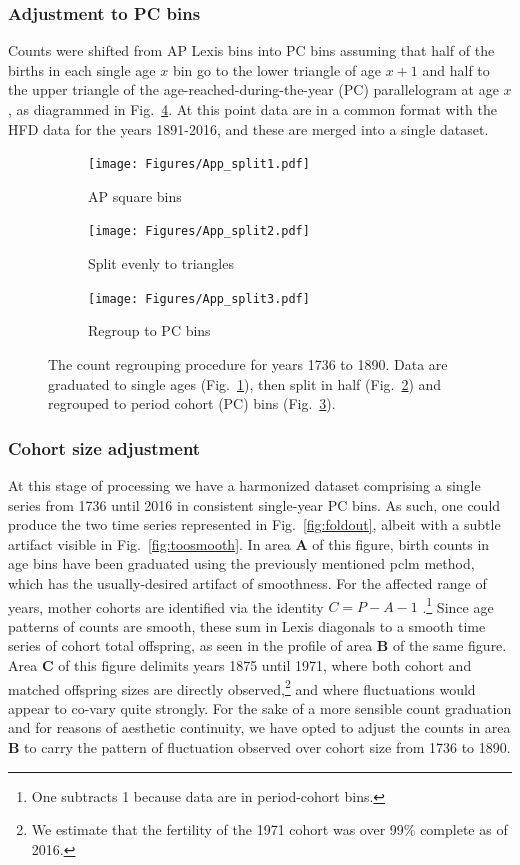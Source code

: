 \subsubsection{Adjustment to PC bins}
Counts were shifted from AP Lexis bins into PC bins assuming that half of the births in each single age $x$ bin go to the lower triangle of age $x+1$ and half to the upper triangle of the age-reached-during-the-year (PC) parallelogram at age $x$, as diagrammed in Fig.~\ref{fig:AP2PC}. At this point data are in a common format with the HFD data for the years 1891-2016, and these are merged into a single dataset.

\begin{figure}[ht!]
\centering
\begin{subfigure}{.3\textwidth}
\centering
\texttt{[image: Figures/App\_split1.pdf]}
\caption{AP square bins}
\label{fig:app1}
\end{subfigure}%
		\begin{subfigure}{.3\textwidth}
\centering
\texttt{[image: Figures/App\_split2.pdf]}
\caption{Split evenly to triangles}
\label{fig:app2}
\end{subfigure}
\begin{subfigure}{.3\textwidth}
\centering
\texttt{[image: Figures/App\_split3.pdf]}
\caption{Regroup to PC bins}
\label{fig:app3}
\end{subfigure}
\caption{The count regrouping procedure for years 1736 to 1890. Data are graduated to single ages (Fig.~\ref{fig:app1}), then split in half (Fig.~\ref{fig:app2}) and regrouped to period cohort (PC) bins (Fig.~\ref{fig:app3}).}
\label{fig:AP2PC}
\end{figure}

\FloatBarrier
\subsubsection{Cohort size adjustment}
\label{sec:cohadj}
At this stage of processing we have a harmonized dataset comprising a single series from 1736 until 2016 in consistent single-year PC bins. As such, one could produce the two time series represented in Fig.~\ref{fig:foldout}, albeit with a subtle artifact visible in Fig.~\ref{fig:toosmooth}. In area \textbf{A} of this figure, birth counts in age bins have been graduated using the previously mentioned pclm method, which has the usually-desired artifact of smoothness. For the affected range of years, mother cohorts are identified via the identity $C = P - A - 1$ .\footnote{One subtracts 1 because data are in period-cohort bins.} Since age patterns of counts are smooth, these sum in Lexis diagonals to a smooth time series of cohort total offspring, as seen in the profile of area \textbf{B} of the same figure. Area \textbf{C} of this figure delimits years 1875 until 1971, where both cohort and matched offspring sizes are directly observed,\footnote{We estimate that the fertility of the 1971 cohort was over 99\% complete as of 2016.} and where fluctuations would appear to co-vary quite strongly. For the sake of a more sensible count graduation and for reasons of aesthetic continuity, we have opted to adjust the counts in area \textbf{B} to carry the pattern of fluctuation observed over cohort size from 1736 to 1890.

